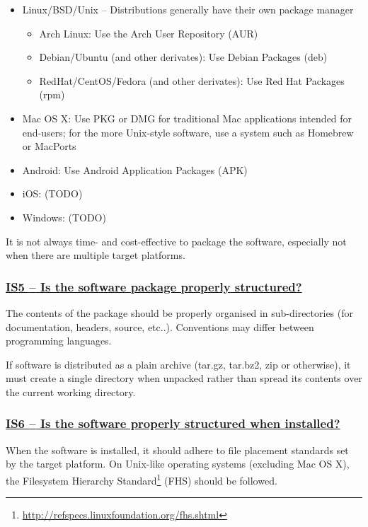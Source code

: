 \documentclass[a4paper,11pt]{article}
\newcommand{\indicator}[1]{\subsubsection*{\underline{#1}}}
\begin{document}
\begin{itemize}
    \item Linux/BSD/Unix -- Distributions generally have their own package manager
    \begin{itemize}
        \item Arch Linux: Use the Arch User Repository (AUR)
        \item Debian/Ubuntu (and other derivates): Use Debian Packages (deb)
        \item RedHat/CentOS/Fedora (and other derivates): Use Red Hat Packages (rpm)
    \end{itemize}
    \item Mac OS X: Use PKG or DMG for traditional Mac applications intended for end-users; for the more Unix-style
        software, use a system such as Homebrew or MacPorts
    \item Android: Use Android Application Packages (APK)
    \item iOS: (TODO) 
    \item Windows: (TODO) 
\end{itemize}

It is not always time- and cost-effective to package the software, especially not
when there are multiple target platforms. 

\newcommand{\isFiveName}{IS5}
\newcommand{\isFiveID}{\isFiveName}
\newcommand{\isFiveText}{Is the software package properly structured?}
\indicator{\isFiveName{ }--{ }\isFiveText}\label{id:is5} 

The contents of the package should be properly organised in sub-directories
(for documentation, headers, source, etc..). Conventions may differ between
programming languages.

If software is distributed as a plain archive (tar.gz, tar.bz2, zip or otherwise),
it must create a single directory when unpacked rather than spread its contents
over the current working directory.

\newcommand{\isSixName}{IS6}
\newcommand{\isSixID}{\isSixName}
\newcommand{\isSixText}{Is the software properly structured when installed?}
\indicator{\isSixName{ }--{ }\isSixText}\label{id:is6} 

When the software is installed, it should adhere to file placement standards set
by the target platform. On Unix-like operating systems (excluding Mac OS X), the Filesystem
Hierarchy Standard\footnote{\url{http://refspecs.linuxfoundation.org/fhs.shtml}} (FHS) should be followed.
\end{document}

